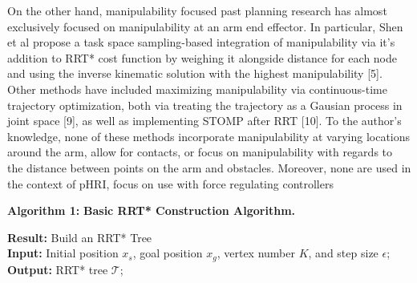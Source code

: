 \documentclass[conference]{IEEEtran}
\begin{document}
On the other hand, manipulability focused past planning research has almost exclusively focused on manipulability at an arm end effector. In particular, Shen et al propose a task space sampling-based integration of manipulability via it’s addition to RRT* cost function by weighing it alongside distance for each node and using the inverse kinematic solution with the highest manipulability [5]. Other methods have included maximizing manipulability via continuous-time trajectory optimization, both via treating the trajectory as a Gausian process in joint space [9], as well as implementing STOMP after RRT [10]. To the author’s knowledge, none of these methods incorporate manipulability at varying locations around the arm, allow for contacts, or focus on manipulability with regards to the distance between points on the arm and obstacles. Moreover, none are used in the context of pHRI, focus on use with force regulating controllers


\noindent\textbf{Algorithm 1:} \textbf{Basic RRT* Construction Algorithm.}

\vspace{1ex}

\noindent\textbf{Result:} Build an RRT* Tree \\
\textbf{Input:} Initial position $x_s$, goal position $x_g$, vertex number $K$, and step size $\epsilon$; \\
\textbf{Output:} RRT* tree $\mathcal{T}$;

\begin{algorithm}[H]
\end{algorithm}
\end{document}
